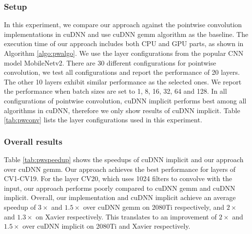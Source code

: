 \subsubsection{Setup} In this experiment, we compare our approach against the pointwise convolution implementations in cuDNN and use cuDNN gemm algorithm as the baseline. 
The execution time of our approach includes both CPU and GPU parts, as shown in Algorithm \ref{algo:pwalgo}.
We use the layer configurations from the popular CNN model MobileNetv2.
There are 30 different configurations for pointwise convolution, we test all configurations and report the performance of 20 layers. 
The other 10 layers exhibit similar performance as the selected ones.  
We report the performance when batch sizes are set to 1, 8, 16, 32, 64 and 128.
In all configurations of pointwise convolution, cuDNN implicit performs best among all algorithms in cuDNN, therefore we only show results of cuDNN implicit.
Table \ref{tab:pwconv} lists the layer configurations used in this experiment.

\subsubsection{Overall results} Table \ref{tab:pwspeedup} shows the speedups of cuDNN implicit and our approach over cuDNN gemm.
Our approach achieves the best performance for layers of CV1-CV19.
For the layer CV20, which uses 1024 filters to convolve with the input, our approach performs poorly compared to cuDNN gemm and cuDNN implicit.
Overall, our implementation and cuDNN implicit achieve an average speedup of $3\times$ and $1.5\times$ over cuDNN gemm on 2080Ti respectively, and $2\times$ and $1.3\times$ on Xavier respectively. 
This translates to an improvement of $2\times$ and $1.5\times$ over cuDNN implicit on 2080Ti and Xavier respectively.

